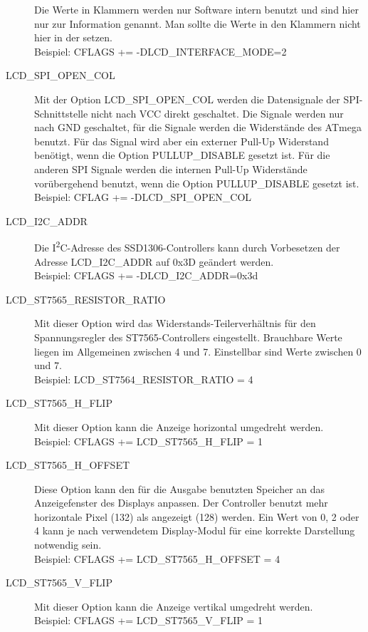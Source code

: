 \begin{description}
Die Werte in Klammern werden nur Software intern benutzt und sind hier nur zur Information genannt.
Man sollte die Werte in den Klammern nicht hier in der  setzen.\\
Beispiel: CFLAGS += -DLCD\_INTERFACE\_MODE=2

  \item[LCD\_SPI\_OPEN\_COL] Mit der Option LCD\_SPI\_OPEN\_COL werden die Datensignale der SPI-Schnittstelle
nicht nach VCC direkt geschaltet.
Die Signale werden nur nach GND geschaltet, für die  Signale werden die  Widerstände
des ATmega benutzt.
Für das Signal  wird aber ein externer Pull-Up Widerstand benötigt, wenn die Option PULLUP\_DISABLE
gesetzt ist. Für die anderen SPI Signale werden die internen Pull-Up Widerstände vorübergehend benutzt,
wenn die Option PULLUP\_DISABLE gesetzt ist.
Beispiel: CFLAG += -DLCD\_SPI\_OPEN\_COL

 \item[LCD\_I2C\_ADDR] Die I\textsuperscript{2}C-Adresse des SSD1306-Controllers kann durch Vorbesetzen der Adresse LCD\_I2C\_ADDR
auf 0x3D geändert werden.\\
Beispiel: CFLAGS += -DLCD\_I2C\_ADDR=0x3d

  \item[LCD\_ST7565\_RESISTOR\_RATIO] Mit dieser Option wird das Widerstands-Teilerverhältnis für den
Spannungsregler des ST7565-Controllers eingestellt. Brauchbare Werte liegen im Allgemeinen zwischen 4 und 7.
Einstellbar sind Werte zwischen 0 und 7.\\
Beispiel: LCD\_ST7564\_RESISTOR\_RATIO = 4

  \item[LCD\_ST7565\_H\_FLIP] Mit dieser Option kann die Anzeige horizontal umgedreht werden.\\
Beispiel: CFLAGS += LCD\_ST7565\_H\_FLIP = 1

  \item[LCD\_ST7565\_H\_OFFSET] Diese Option kann den für die Ausgabe benutzten Speicher an das Anzeigefenster des
 Displays anpassen. Der Controller benutzt mehr horizontale Pixel (132) als angezeigt (128) werden.
 Ein Wert von 0, 2 oder 4 kann je nach verwendetem Display-Modul für eine korrekte Darstellung notwendig sein.\\
Beispiel: CFLAGS += LCD\_ST7565\_H\_OFFSET = 4

  \item[LCD\_ST7565\_V\_FLIP] Mit dieser Option kann die Anzeige vertikal umgedreht werden.\\
Beispiel: CFLAGS += LCD\_ST7565\_V\_FLIP = 1


\end{description}
